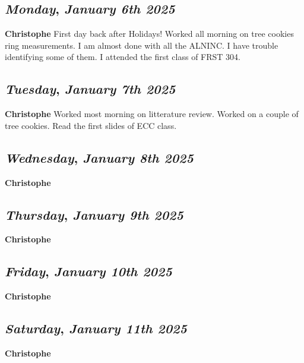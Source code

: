 \begin{center}
\section*{\month}
\end{center}

\def\day{\textit{January 6th 2025}}
\def\weekday{\textit{Monday}}
\subsection*{\weekday, \day}
\textbf {Christophe}
First day back after Holidays!
Worked all morning on tree cookies ring measurements. I am almost done with all the ALNINC.  I have trouble identifying some of them.
I attended the first class of FRST 304. 

\def\day{\textit{January 7th 2025}}
\def\weekday{\textit{Tuesday}}
\subsection*{\weekday, \day}
\textbf {Christophe}
Worked most morning on litterature review. Worked on a couple of tree cookies. Read the first slides of ECC class. 

\def\day{\textit{January 8th 2025}}
\def\weekday{\textit{Wednesday}}
\subsection*{\weekday, \day}
\textbf {Christophe}

\def\day{\textit{January 9th 2025}}
\def\weekday{\textit{Thursday}}
\subsection*{\weekday, \day}
\textbf {Christophe}

\def\day{\textit{January 10th 2025}}
\def\weekday{\textit{Friday}}
\subsection*{\weekday, \day}
\textbf {Christophe}

\def\day{\textit{January 11th 2025}}
\def\weekday{\textit{Saturday}}
\subsection*{\weekday, \day}
\textbf {Christophe}

\def\day{\textit{January 12th 2025}}
\def\weekday{\textit{Sunday}}

